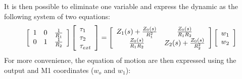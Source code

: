 It is then possible to eliminate one variable and express the dynamic as the following system of two equations:
%
\begin{align}
\left[
\begin{array}{c c c}
 1 & 0 & \frac{1}{R_1} \\
 0 & 1 & \frac{1}{R_2}
\end{array}
\right]
\left[
\begin{array}{l}
 \tau_{1} \\
 \tau_{2} \\
 \tau_{ext}
\end{array}
\right]
=
\left[
\begin{array}{c c}
 Z_1(s) + \frac{Z_0(s)}{R_1^2} & \frac{Z_0(s)}{R_1 R_2}        \\
 \frac{Z_0(s)}{R_1 R_2}        & Z_2(s) + \frac{Z_0(s)}{R_2^2} \\
\end{array}
\right]
\left[
\begin{array}{l}
w_1     \\
w_2     \\
\end{array}
\right]
\end{align}
%
For more convenience, the equation of motion are then expressed using the output and M1 coordinates ($w_o$ and $w_1$):
%
